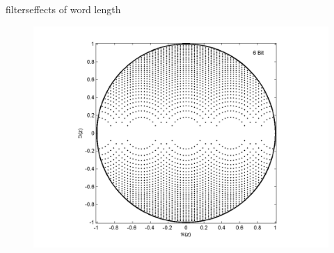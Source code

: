 \begin{frame}{filters}{effects of word length}
{\begin{figure}
\begin{flushright}
						\includegraphics[scale=.35]{graph/QuantPolePlotDirect_2}
					\end{flushright}
				\end{figure}
			}
\end{frame}
